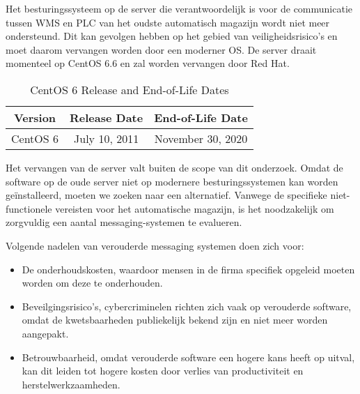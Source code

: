 
Het besturingssysteem op de server die verantwoordelijk is voor de communicatie tussen WMS en PLC van het oudste automatisch magazijn wordt niet meer ondersteund.
Dit kan gevolgen hebben op het gebied van veiligheidsrisico's en moet daarom vervangen worden door een moderner OS.
De server draait momenteel op CentOS 6.6 en zal worden vervangen door Red Hat.
\begin{table}[h!]
  \centering
  \begin{tabular}{|c|c|c|}
      \hline
      \textbf{Version} & \textbf{Release Date} & \textbf{End-of-Life Date} \\
      \hline
      CentOS 6 & July 10, 2011 & November 30, 2020 \\
      \hline
  \end{tabular}
  \caption{CentOS 6 Release and End-of-Life Dates}
  \label{tab:centos6}
\end{table}
\newline

Het vervangen van de server valt buiten de scope van dit onderzoek. 
\newline
Omdat de software op de oude server niet op modernere besturingssystemen kan worden geïnstalleerd, 
moeten we zoeken naar een alternatief. 
Vanwege de specifieke niet-functionele vereisten voor het automatische magazijn, 
is het noodzakelijk om zorgvuldig een aantal messaging-systemen te evalueren.
\newline

Volgende nadelen van verouderde messaging systemen doen zich voor: 
\begin{itemize}
  \item De onderhoudskosten, waardoor mensen in de firma specifiek opgeleid moeten worden om deze te onderhouden. 
  \item Beveilgingsrisico's, cybercriminelen richten zich vaak op verouderde software, omdat de kwetsbaarheden publiekelijk bekend zijn en niet meer worden aangepakt.
  \item Betrouwbaarheid, omdat verouderde software een hogere kans heeft op uitval, kan dit leiden tot hogere kosten door verlies van productiviteit en herstelwerkzaamheden.
\end{itemize}
 

